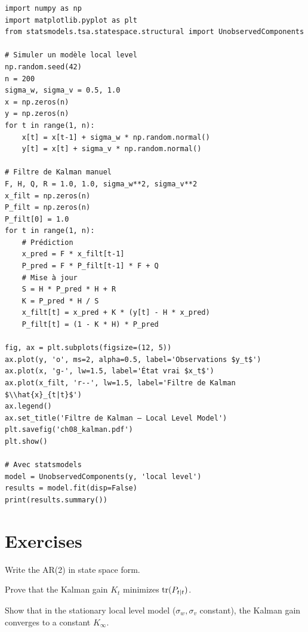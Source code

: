 \begin{codeblock}[title=\textbf{Python}]
\begin{verbatim}
import numpy as np
import matplotlib.pyplot as plt
from statsmodels.tsa.statespace.structural import UnobservedComponents

# Simuler un modèle local level
np.random.seed(42)
n = 200
sigma_w, sigma_v = 0.5, 1.0
x = np.zeros(n)
y = np.zeros(n)
for t in range(1, n):
    x[t] = x[t-1] + sigma_w * np.random.normal()
    y[t] = x[t] + sigma_v * np.random.normal()

# Filtre de Kalman manuel
F, H, Q, R = 1.0, 1.0, sigma_w**2, sigma_v**2
x_filt = np.zeros(n)
P_filt = np.zeros(n)
P_filt[0] = 1.0
for t in range(1, n):
    # Prédiction
    x_pred = F * x_filt[t-1]
    P_pred = F * P_filt[t-1] * F + Q
    # Mise à jour
    S = H * P_pred * H + R
    K = P_pred * H / S
    x_filt[t] = x_pred + K * (y[t] - H * x_pred)
    P_filt[t] = (1 - K * H) * P_pred

fig, ax = plt.subplots(figsize=(12, 5))
ax.plot(y, 'o', ms=2, alpha=0.5, label='Observations $y_t$')
ax.plot(x, 'g-', lw=1.5, label='État vrai $x_t$')
ax.plot(x_filt, 'r--', lw=1.5, label='Filtre de Kalman $\\hat{x}_{t|t}$')
ax.legend()
ax.set_title('Filtre de Kalman — Local Level Model')
plt.savefig('ch08_kalman.pdf')
plt.show()

# Avec statsmodels
model = UnobservedComponents(y, 'local level')
results = model.fit(disp=False)
print(results.summary())
\end{verbatim}
\end{codeblock}

\section{Exercises}

\begin{exercise}[$\star$]
Write the AR(2) in state space form.
\end{exercise}

\begin{exercise}[$\star\star$]
Prove that the Kalman gain $K_t$ minimizes $\operatorname{tr}(P_{t|t})$.
\end{exercise}

\begin{exercise}[$\star\star$]
Show that in the stationary local level model ($\sigma_w,\sigma_v$ constant), the Kalman gain converges to a constant $K_\infty$.
\end{exercise}

